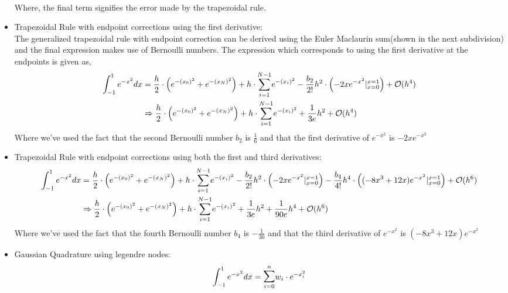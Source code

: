 \documentclass[letterpaper]{exam}
\begin{document}
\begin{questions}
\begin{solution}
\begin{itemize}
\begin{align*}
    \end{align*}
    Where, the final term signifies the error made by the trapezoidal rule.
    \item Trapezoidal Rule with endpoint corrections using the first derivative:\\
    The generalized trapezoidal rule with endpoint correction can be derived using the Euler Maclaurin sum(shown in the next subdivision) and the final expression makes use of Bernoulli numbers. The expression which corresponds to using the first derivative at the endpoints is given as,
    \begin{align*}
        \int_{-1}^{1} e^{-x^2} dx &= \frac{h}{2}\cdot\left(e^{-(x_0)^2}+e^{-(x_N)^2}\right) + h\cdot\overset{N-1}{\underset{i=1}{\sum}} e^{-(x_i)^2} -\frac{b_2}{2!}h^2\cdot\left(-2xe^{-x^2}\huge{|}_{x=0}^{x=1}\right) + \mathcal{O}(h^4)\\
        &\Rightarrow
        \frac{h}{2}\cdot\left(e^{-(x_0)^2}+e^{-(x_N)^2}\right) + h\cdot\overset{N-1}{\underset{i=1}{\sum}} e^{-(x_i)^2} +\frac{1}{3e}h^2 + \mathcal{O}(h^4)
    \end{align*}
    Where we've used the fact that the second Bernoulli number $b_2$ is $\frac{1}{6}$ and that the first derivative of $e^{-x^2}$ is $-2xe^{-x^2}$ 
    \item Trapezoidal Rule with endpoint corrections using both the first and third derivatives:\\
    \begin{align*}
        \int_{-1}^{1} e^{-x^2} dx &= \frac{h}{2}\cdot\left(e^{-(x_0)^2}+e^{-(x_N)^2}\right) + h\cdot\overset{N-1}{\underset{i=1}{\sum}} e^{-(x_i)^2} -\frac{b_2}{2!}h^2\cdot\left(-2xe^{-x^2}\Huge{|}_{x=0}^{x=1}\right) 
        -\frac{b_4}{4!}h^4\cdot\left((-8x^3+12x)e^{-x^2}\Huge{|}_{x=0}^{x=1}\right)
        +\mathcal{O}(h^6)\\
        &\Rightarrow
        \frac{h}{2}\cdot\left(e^{-(x_0)^2}+e^{-(x_N)^2}\right) + h\cdot\overset{N-1}{\underset{i=1}{\sum}} e^{-(x_i)^2} +\frac{1}{3e}h^2 + \frac{1}{90e}h^4 + \mathcal{O}(h^6)
    \end{align*}
     Where we've used the fact that the fourth Bernoulli number $b_4$ is $-\frac{1}{30}$ and that the third derivative of $e^{-x^2}$ is $(-8x^3+12x)e^{-x^2}$ 
     \item Gaussian Quadrature using legendre nodes:\\
            \begin{align}
            \int_{-1}^{1}e^{-x^2} dx = \overset{n}{\underset{i = 0}{\mathlarger{\mathlarger{\sum}}}} w_i\cdot e^{-x_i^2} 

\end{align}
\end{itemize}
\end{solution}
\end{questions}
\end{document}
